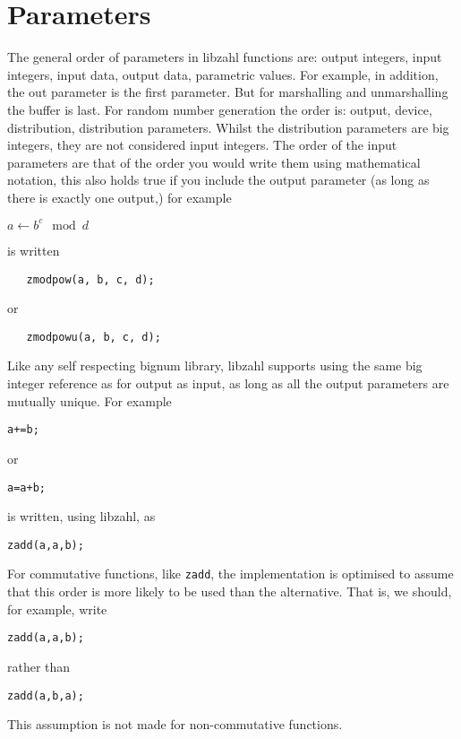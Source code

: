 \newpage
\section{Parameters}
\label{sec:Parameters}

The general order of parameters in libzahl functions
are: output integers, input integers, input data,
output data, parametric values. For example, in
addition, the out parameter is the first parameter.
But for marshalling and unmarshalling the buffer
is last. For random number generation the order is:
output, device, distribution, distribution parameters.
Whilst the distribution parameters are big integers,
they are not considered input integers. The order
of the input parameters are that of the order you
would write them using mathematical notation, this
also holds true if you include the output parameter
(as long as there is exactly one output,) for example

\vspace{1ex}
$a \gets b^c \mod d$
\vspace{1ex}

\noindent
is written

\begin{verbatim}
   zmodpow(a, b, c, d);
\end{verbatim}

\noindent
or

\begin{verbatim}
   zmodpowu(a, b, c, d);
\end{verbatim}

Like any self respecting bignum library, libzahl
supports using the same big integer reference as
for output as input, as long as all the output
parameters are mutually unique. For example

\begin{alltt}
   a += b;
\end{alltt}

\noindent
or

\begin{alltt}
   a = a + b;
\end{alltt}

\noindent
is written, using libzahl, as

\begin{alltt}
   zadd(a, a, b);
\end{alltt}

For commutative functions, like {\tt zadd}, the
implementation is optimised to assume that this
order is more likely to be used than the alternative.
That is, we should, for example, write

\begin{alltt}
   zadd(a, a, b);
\end{alltt}

\noindent
rather than

\begin{alltt}
   zadd(a, b, a);
\end{alltt}

\noindent
This assumption is not made for non-commutative
functions.

